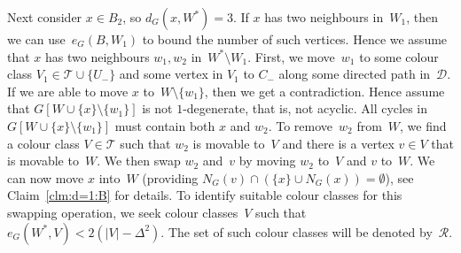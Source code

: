\documentclass[11pt]{article}
\theoremstyle{plain}
\numberwithin{equation}{section}
\begin{document}
Next consider $x \in B_2$, so $d_G(x,W^*)=3$.
If $x$ has two neighbours in~$W_1$, then we can use~$e_G(B,W_1)$ to bound the number of such vertices.
Hence we assume that $x$ has two neighbours $w_1, w_2$ in~$W^* \setminus W_1$.
First, we move~$w_1$ to some colour class $V_1\in \mathcal{T}\cup\{U_-\}$ and some vertex in $V_1$ to $C_-$ along some directed path in~$\mathcal{D}$.
If we are able to move $x$ to~$W \setminus \{w_1\}$, then we get a contradiction.
Hence assume that $G[W \cup \{x\} \setminus \{w_1\}]$ is not $1$-degenerate, that is, not acyclic.
All cycles in  $G[W \cup \{x\} \setminus \{w_1\}]$ must contain both $x$ and $w_2$.
To remove~$w_2$ from~$W$, we find a colour class $V \in \mathcal{T}$ such that $w_2$ is movable to~$V$ and there is a vertex $v \in V$ that is movable to~$W$.
We then swap $w_2$ and~$v$ by moving $w_2$ to~$V$ and $v$ to~$W$.
We can now move $x$ into~$W$ (providing $N_G(v) \cap ( \{ x \} \cup N_G(x)) = \emptyset$), see Claim~\ref{clm:d=1:B} for details.
To identify suitable colour classes for this swapping operation, we seek colour classes~$V$ such that
$e_G(W^*,V) < 2(|V|-\Delta^2)$.
The set of such colour classes will be denoted by~$\mathcal{R}$.
\end{document}
